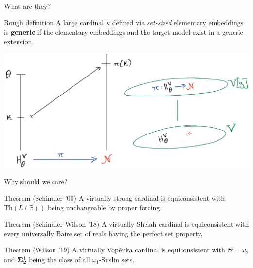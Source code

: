 \documentclass{beamer}
\begin{document}
\begin{frame}{What are they?}
  \begin{block}{Rough definition}
    A large cardinal $\kappa$ defined via \textit{set-sized} elementary embeddings is \textbf{generic} if the elementary embeddings {\color{red} and the target model} exist in a generic extension.
  \end{block}

  \begin{center}
    \includegraphics[scale=0.17]{gfx/generic.jpg}
  \end{center}
\end{frame}

\begin{frame}{Why should we care?}
  \begin{block}{Theorem (Schindler '00)}
    A virtually strong cardinal is equiconsistent with $\text{Th}(L(\mathbb R))$ being unchangeable by proper forcing.
  \end{block}
  
  \pause

  \begin{block}{Theorem (Schindler-Wilson '18)}
    A virtually Shelah cardinal is equiconsistent with every universally Baire set of reals having the perfect set property.
  \end{block}

  \pause
  
  \begin{block}{Theorem (Wilson '19)}
    A virtually Vop\v enka cardinal is equiconsistent with $\Theta=\omega_2$ and ${\bf\Sigma}^1_2$ being the class of all $\omega_1$-Suslin sets.
  \end{block}
\end{frame}
\end{document}

